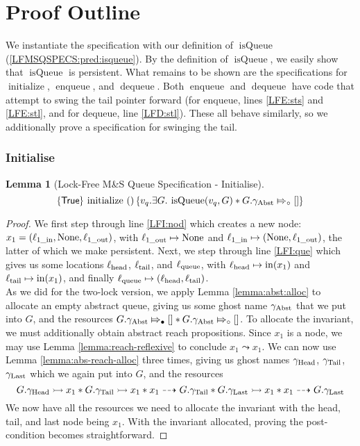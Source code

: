 \documentclass[a4paper, 10pt]{report}
\theoremstyle{definition}
\newtheorem{lemma}[theorem]{Lemma}
\newcommand{\initialise}{\operatorname{initialize}}
\newcommand{\enqueue}{\operatorname{enqueue}}
\newcommand{\dequeue}{\operatorname{dequeue}}
\newcommand{\msq}{M\&S Queue}
\newcommand{\lfmsq}{Lock-Free \msq{}}
\newcommand{\isqueue}{\operatorname{isQueue}}
\newcommand{\vq}{v_q}
\newcommand{\locinM}[1]{\loc_{#1\_\mathrm{in}}}
\newcommand{\locoutM}[1]{\loc_{#1\_\mathrm{out}}}
\newcommand{\locN}[1]{\loc_{\mathrm{#1}}}
\newcommand{\lochead}{\locN{head}}
\newcommand{\loctail}{\locN{tail}}
\newcommand{\locqueue}{\locN{queue}}
\newcommand{\nIn}[1]{\operatorname{in}(#1)}
\newcommand{\node}{x}
\newcommand{\nodeM}[1]{\node_{#1}}
\newcommand{\Qg}{G}
\newcommand{\gabst}{\gname_{\mathrm{Abst}}}
\newcommand{\ghead}{\gname_{\mathrm{Head}}}
\newcommand{\gtail}{\gname_{\mathrm{Tail}}}
\newcommand{\glast}{\gname_{\mathrm{Last}}}
\newcommand{\abstractstatefullfrag}[2]{#1 \Mapsto_{\circ} #2}
\newcommand{\abstractstateauth}[2]{#1 \Mapsto_{\bullet} #2}
\newcommand{\reach}[2]{#1 \leadsto #2}
\newcommand{\ar}[2]{#1 \dashrightarrow #2}
\newcommand{\ap}[2]{#1 \rightarrowtail #2}
\newcommand{\hocapspecinitHTGen}[2]{\hoare{\TRUE}{\initialise \ \TT}{#1 . \Exists #2 . \isqueue(#1, #2) \star{} \abstractstatefullfrag{#2.\gabst}{[]}}}
\newcommand{\hocapspecinitGen}[2]{\hocapspecinitHTGen{#1}{#2}}
\newcommand{\hocapspecinit}{\hocapspecinitGen{\vq}{\Qg}}
\begin{document}
\section{Proof Outline}
\label{LFMSQSPECS:section:proof-outline}

We instantiate the specification with our definition of $\isqueue$ (\ref{LFMSQSPECS:pred:isqueue}). By the definition of $\isqueue$, we easily show that $\isqueue$ is persistent. What remains to be shown are the specifications for $\initialise$, $\enqueue$, and $\dequeue$. Both $\enqueue$ and $\dequeue$ have code that attempt to swing the tail pointer forward (for enqueue, lines \ref{LFE:sts} and \ref{LFE:stl}, and for dequeue, line \ref{LFD:stl}). These all behave similarly, so we additionally prove a specification for swinging the tail.

\subsubsection{Initialise}
\begin{lemma}[\lfmsq{} Specification - Initialise]\label{LFMSQSPECS:spec:init}
  \begin{equation*}
    \hocapspecinit
  \end{equation*}
\end{lemma}
\begin{proof}
We first step through line \ref{LFI:nod} which creates a new node: $\nodeM{1} = (\locinM{1}, \None, \locoutM{1})$, with $\locoutM{1} \mapsto \None$ and $\locinM{1} \mapsto (\None, \locoutM{1})$, the latter of which we make persistent. Next, we step through line \ref{LFI:que} which gives us some locations $\lochead$, $\loctail$, and $\locqueue$, with $\lochead \mapsto \nIn{\nodeM{1}}$ and $\loctail \mapsto \nIn{\nodeM{1}}$, and finally $\locqueue \mapsto (\lochead, \loctail)$.\\
As we did for the two-lock version, we apply Lemma \ref{lemma:abst:alloc} to allocate an empty abstract queue, giving us some ghost name $\gabst$ that we put into $\Qg$, and the resources $\abstractstateauth{\Qg.\gabst}{[]} \star{} \abstractstatefullfrag{\Qg.\gabst}{[]}$. To allocate the invariant, we must additionally obtain abstract reach propositions. Since $\nodeM{1}$ is a node, we may use Lemma \ref{lemma:reach-reflexive} to conclude $\reach{\nodeM{1}}{\nodeM{1}}$. We can now use Lemma \ref{lemma:abs-reach-alloc} three times, giving us ghost names $\ghead$, $\gtail$, $\glast$ which we again put into $\Qg$, and the resources
\begin{equation*}
  \ap{\Qg.\ghead}{\nodeM{1}} \star{} \ap{\Qg.\gtail}{\nodeM{1}} \star{} \ar{\nodeM{1}}{\Qg.\gtail} \star{} \ap{\Qg.\glast}{\nodeM{1}} \star{} \ar{\nodeM{1}}{\Qg.\glast}
\end{equation*}
We now have all the resources we need to allocate the invariant with the head, tail, and last node being $\nodeM{1}$. With the invariant allocated, proving the post-condition becomes straightforward.
\end{proof}
\end{document}
